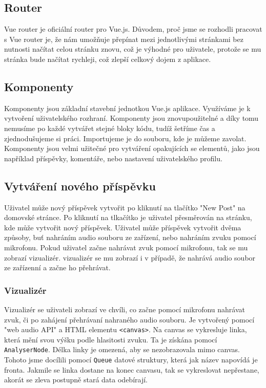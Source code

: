 \subsection{Router}

Vue router je oficiální router pro Vue.js. Důvodem, proč jsme se rozhodli
pracovat s Vue router je, že nám umožňuje přepínat mezi jednotlivými stránkami
bez nutnosti načítat celou stránku znovu, což je výhodné pro uživatele, protože
se mu stránka bude načítat rychleji, což zlepší celkový dojem z aplikace.

\subsection{Komponenty}

Komponenty jsou základní stavební jednotkou Vue.js aplikace. Využíváme je
k vytvoření uživatelského rozhraní. Komponenty jsou znovupoužitelné a díky tomu
nemusíme po každé vytvářet stejné bloky kódu, tudíž šetříme čas a zjednodušujeme
si práci. Importujeme je do souboru, kde je můžeme zavolat. Komponenty jsou velmi
užitečné pro vytváření opakujících se elementů, jako jsou například příspěvky, 
komentáře, nebo nastavení uživatelského profilu. 

\subsection{Vytváření nového příspěvku}

Uživatel může nový příspěvek vytvořit po kliknutí na tlačítko "New Post" na domovské
stránce. Po kliknutí na tlkačítko je uživatel přesměrován na stránku, kde může
vytvořit nový příspěvek. Uživatel může příspěvek vytvořit dvěma způsoby, buť nahráním 
audio souboru ze zařízení, nebo nahráním zvuku pomocí mikrofonu. Pokud uživatel 
začne nahrávat zvuk pomocí mikrofonu, tak se mu zobrazí vizualizér. vizualizér se
mu zobrazí i v případě, že nahrává audio soubor ze zařízenní a začne ho přehrávat.

\subsubsection{Vizualizér}

Vizualizér se uživateli zobrazí ve chvíli, co začne pomocí mikrofonu nahrávat zvuk,
či po zahájení přehrávaní nahraného audio souboru. Je vytvořený pomocí "web audio API"
a HTML elementu \texttt{<canvas>}. Na canvas se vykresluje linka, která mění svou výšku podle
hlasitosti zvuku. Ta je získána pomocí \texttt{AnalyserNode}. Délka linky je omezená, aby
se nezobrazovala mimo canvas. Tohoto jsme docílili pomocí \texttt{Queue} datové struktury, 
která jak název napovídá je fronta. Jakmile se linka dostane na konec canvasu, tak se 
vykreslovat nepřestane, akorát se zleva postupně stará data odebírají.

